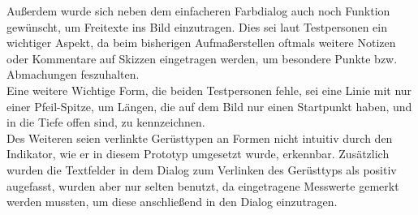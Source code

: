 Außerdem wurde sich neben dem einfacheren Farbdialog auch noch Funktion gewünscht, um Freitexte ins Bild einzutragen. 
Dies sei laut Testpersonen ein wichtiger Aspekt, da beim bisherigen Aufmaßerstellen oftmals weitere Notizen oder Kommentare auf Skizzen eingetragen werden, um besondere Punkte bzw. Abmachungen feszuhalten. \\

Eine weitere Wichtige Form, die beiden Testpersonen fehle, sei eine Linie mit nur einer Pfeil-Spitze, um Längen, die auf dem Bild nur einen Startpunkt haben, und in die Tiefe offen sind, zu kennzeichnen. \\

Des Weiteren seien verlinkte Gerüsttypen an Formen nicht intuitiv durch den Indikator, wie er in diesem Prototyp umgesetzt wurde, erkennbar.
Zusätzlich wurden die Textfelder in dem Dialog zum Verlinken des Gerüsttyps als positiv augefasst, wurden aber nur selten benutzt, da eingetragene Messwerte gemerkt werden mussten, um diese anschließend in den Dialog einzutragen. \\
